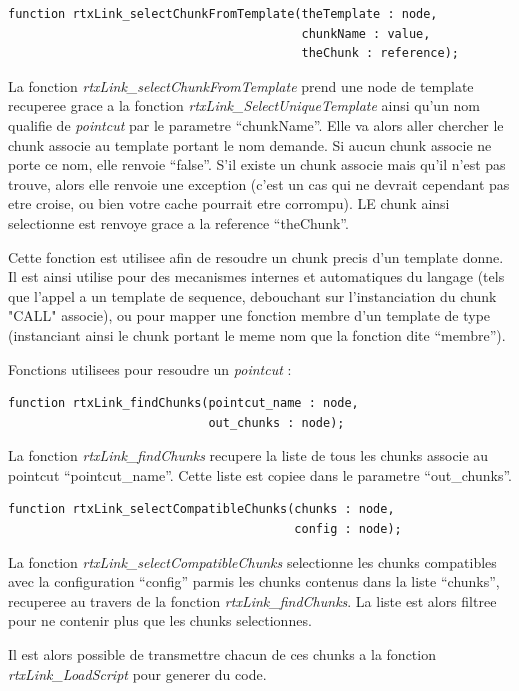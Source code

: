 \documentclass[french]{rtxreport}
\begin{document}
\begin{lstlisting}
function rtxLink_selectChunkFromTemplate(theTemplate : node,
                                         chunkName : value,
                                         theChunk : reference);
\end{lstlisting}
La fonction \emph{rtxLink\_selectChunkFromTemplate} prend une node de template
recuperee grace a la fonction \emph{rtxLink\_SelectUniqueTemplate} ainsi qu'un
nom qualifie de \emph{pointcut} par le parametre ``chunkName''. Elle va alors
aller chercher le chunk associe au template portant le nom demande. Si aucun
chunk associe ne porte ce nom, elle renvoie ``false''. S'il existe un chunk
associe mais qu'il n'est pas trouve, alors elle renvoie une exception (c'est un
cas qui ne devrait cependant pas etre croise, ou bien votre cache pourrait etre
corrompu). LE chunk ainsi selectionne est renvoye grace a la reference
``theChunk''.

Cette fonction est utilisee afin de resoudre un chunk precis d'un template
donne. Il est ainsi utilise pour des mecanismes internes et automatiques du
langage (tels que l'appel a un template de sequence, debouchant sur
l'instanciation du chunk "CALL" associe), ou pour mapper une fonction membre
d'un template de type (instanciant ainsi le chunk portant le meme nom que la
fonction dite ``membre'').

\vspace{20pt}

Fonctions utilisees pour resoudre un \emph{pointcut} :
\begin{lstlisting}
function rtxLink_findChunks(pointcut_name : node,
                            out_chunks : node);
\end{lstlisting}
La fonction \emph{rtxLink\_findChunks} recupere la liste de tous les chunks
associe au pointcut ``pointcut\_name''. Cette liste est copiee dans le
parametre ``out\_chunks''.


\begin{lstlisting}
function rtxLink_selectCompatibleChunks(chunks : node,
                                        config : node);
\end{lstlisting}
La fonction \emph{rtxLink\_selectCompatibleChunks} selectionne les chunks
compatibles avec la configuration ``config'' parmis les chunks contenus dans la
liste ``chunks'', recuperee au travers de la fonction
\emph{rtxLink\_findChunks}. La liste est alors filtree pour ne contenir plus
que les chunks selectionnes.

Il est alors possible de transmettre chacun de ces chunks a la fonction
\emph{rtxLink\_LoadScript} pour generer du code.
\end{document}
